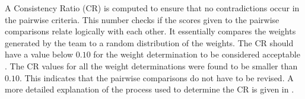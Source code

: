 A Consistency Ratio (CR) is computed to ensure that no contradictions occur in the pairwise criteria. This number checks if the scores given to the pairwise comparisons relate logically with each other. It essentially compares the weights generated by the team to a random distribution of the weights. The CR should have a value below $0.10$ for the weight determination to be considered acceptable \cite{AHPtut}. The CR values for all the weight determinations were found to be smaller than $0.10$. This indicates that the pairwise comparisons do not have to be revised. A more detailed explanation of the process used to determine the CR is given in \cite{greenAHP}. 



